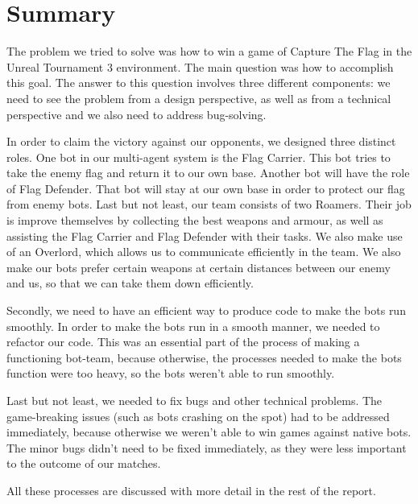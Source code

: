 \chapter*{Summary}
The problem we tried to solve was how to win a game of Capture The Flag in the Unreal Tournament 3 environment. The main question was how to accomplish this goal. The answer to this question involves three different components: we need to see the problem from a design perspective, as well as from a technical perspective and we also need to address bug-solving.

In order to claim the victory against our opponents, we designed three distinct roles. One bot in our multi-agent system is the Flag Carrier. This bot tries to take the enemy flag and return it to our own base. Another bot will have the role of Flag Defender. That bot will stay at our own base in order to protect our flag from enemy bots. Last but not least, our team consists of two Roamers. Their job is improve themselves by collecting the best weapons and armour, as well as assisting the Flag Carrier and Flag Defender with their tasks. We also make use of an Overlord, which allows us to communicate efficiently in the team. We also make our bots prefer certain weapons at certain distances between our enemy and us, so that we can take them down efficiently.

Secondly, we need to have an efficient way to produce code to make the bots run smoothly. In order to make the bots run in a smooth manner, we needed to refactor our code. This was an essential part of the process of making a functioning bot-team, because otherwise, the processes needed to make the bots function were too heavy, so the bots weren't able to run smoothly.

Last but not least, we needed to fix bugs and other technical problems. The game-breaking issues (such as bots crashing on the spot) had to be addressed immediately, because otherwise we weren't able to win games against native bots. The minor bugs didn't need to be fixed immediately, as they were less important to the outcome of our matches.

All these processes are discussed with more detail in the rest of the report.